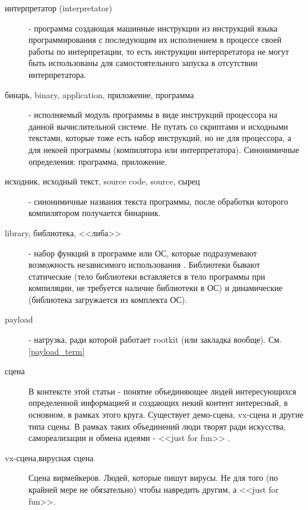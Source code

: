 \begin{description}
\item[интерпретатор (interpretator)]
 - программа создающая машинные инструкции из инструкций
языка программирования с последующим их исполнением в процессе своей работы по интерпретации,
то есть инструкции интерпретатора не могут быть использованы для самостоятельного запуска в отсутствии
интерпретатора.

\item[бинарь, binary, application, приложение, программа]
 - исполняемый модуль программы в виде инструкций процессора на данной
 вычислительной
системе. Не путать со скриптами и исходными текстами, которые тоже
есть набор инструкций,
 но не для
процессора, а для некоей программы (компилятора или интерпретатора).
Синонимичные определения: программа, приложение.

\item[исходник, исходный текст, source code, source, сырец ]
 - синонимичные названия текста программы, после
обработки которого компилятором получается бинарник.

\item[library, библиотека, <<либа>>]
 - набор функций в программе или ОС, которые
подразумевают
возможность независимого использования . Библиотеки бывают статические (тело библиотеки
вставляется в тело программы при компиляции, не требуется наличие библиотеки в ОС) и
 динамические (библиотека загружается из комплекта ОС).

\item[payload]
 - нагрузка, ради которой работает rootkit (или закладка вообще). См. \ref{payload_term}

\item[сцена]
В контексте этой статьи - понятие объединяющее людей интересующихся определенной информацией
и создающих некий контент интересный, в основном, в рамках этого круга. Существует демо-сцена,
vx-сцена и другие типа сцены. В рамках таких объединений люди творят ради искусства,
самореализации и обмена идеями -  <<just for fun>> .

\item[vx-сцена,вирусная сцена]
Сцена вирмейкеров. Людей, которые пишут вирусы. Не для того (по крайней мере не обязательно) чтобы навредить другим, а <<just for fun>>.


\end{description}
